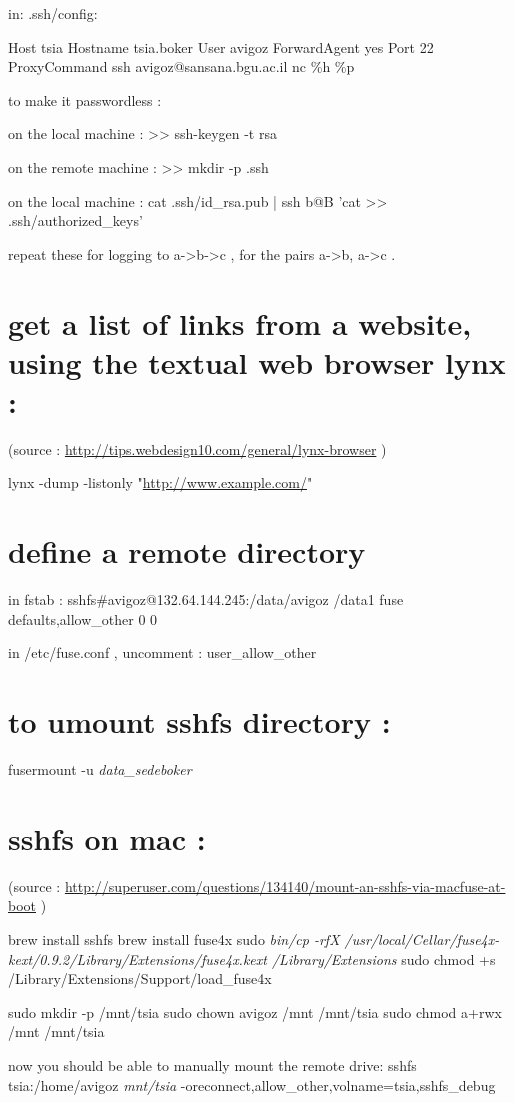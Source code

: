 \documentclass[11pt]{article}
\begin{document}
in: .ssh/config:

Host tsia
Hostname tsia.boker
User avigoz
ForwardAgent yes
Port 22
ProxyCommand ssh avigoz@sansana.bgu.ac.il nc \%h \%p

to make it passwordless :

on the local machine :
>> ssh-keygen -t rsa

on the remote machine : 
>> mkdir -p .ssh

on the local machine :
cat .ssh/id\_rsa.pub | ssh b@B 'cat >> .ssh/authorized\_keys'

repeat these for logging to a->b->c , for the pairs  a->b, a->c .
\section{get a list of links from a website, using the textual web browser lynx :}
\label{sec-31}
(source : \url{http://tips.webdesign10.com/general/lynx-browser} )

lynx -dump -listonly "\url{http://www.example.com/}"

\section{define a remote directory}
\label{sec-32}
in fstab :
sshfs\#avigoz@132.64.144.245:/data/avigoz /data1 fuse defaults,allow\_other 0 0

in /etc/fuse.conf , uncomment :
user\_allow\_other
\section{to umount sshfs directory :}
\label{sec-33}
fusermount -u \emph{data\_sedeboker}
\section{sshfs on mac :}
\label{sec-34}
(source : \url{http://superuser.com/questions/134140/mount-an-sshfs-via-macfuse-at-boot} )

brew install sshfs
brew install fuse4x
sudo \emph{bin/cp -rfX /usr/local/Cellar/fuse4x-kext/0.9.2/Library/Extensions/fuse4x.kext /Library/Extensions}
sudo chmod +s /Library/Extensions/Support/load\_fuse4x

sudo mkdir -p /mnt/tsia
sudo chown avigoz /mnt /mnt/tsia
sudo chmod a+rwx /mnt /mnt/tsia

now you should be able to manually mount the remote drive: 
sshfs tsia:/home/avigoz \emph{mnt/tsia} -oreconnect,allow\_other,volname=tsia,sshfs\_debug
\end{document}
